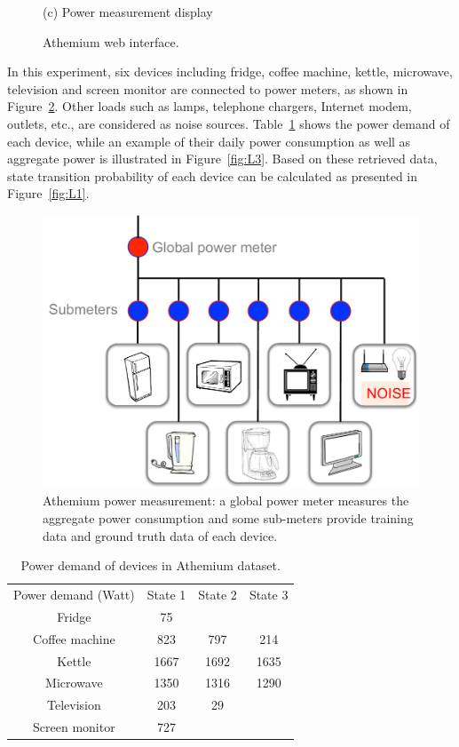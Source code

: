 \begin{figure}[htb]
\begin{minipage}[h]{0.48\linewidth}
\centerline{(c) Power measurement display}\medskip
\end{minipage}
\caption{Athemium web interface.}
\label{fig:L22}
%
\end{figure}

In this experiment, six devices including fridge, coffee machine, kettle, microwave, television and screen monitor are connected to power meters, as shown in Figure~\ref{fig:L23}. Other loads such as lamps, telephone chargers, Internet modem, outlets, etc., are considered as noise sources. Table~\ref{table:t1} shows the power demand of each device, while an example of their daily power consumption as well as aggregate power is illustrated in Figure~\ref{fig:L3}. Based on these retrieved data, state transition probability of each device can be calculated as presented in Figure~\ref{fig:L1}.

\begin{figure}
\centering
\includegraphics[width=.65\textwidth]{./chapters/chapter3/images/A_topo.pdf} 
\caption{Athemium power measurement: a global power meter measures the aggregate power consumption and some sub-meters provide training data and ground truth data of each device.} 
\label{fig:L23} 
\end{figure}

\begin{table}
\caption{Power demand of devices in Athemium dataset.}\label{table:t1}
\begin{center}
\begin{tabular}{|c|c|c|c|}
\hline
Power demand (Watt)& State 1&State 2&State 3 \\ \hhline{|=|=|=|=|}
Fridge &75& & \\ \hline
Coffee machine &823 &797 & 214 \\ \hline
Kettle & 1667 & 1692 & 1635\\ \hline
Microwave &1350 & 1316 & 1290 \\ \hline
Television & 203 & 29 & \\ \hline 
Screen monitor & 727 & & \\ \hline
\end{tabular}
\end{center}
\end{table}



